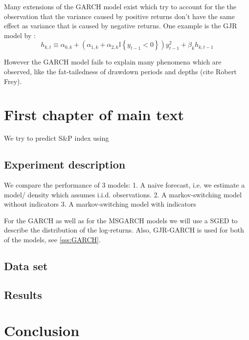 \documentclass[11pt,a4paper]{article}
\begin{document}
Many extensions of the GARCH model exist which try to account for the the observation that the variance caused by positive returns don't have the same effect as variance that is caused by negative returns. One example is the GJR model by \cite{}: $$ h_{k, t} \equiv \alpha_{0, k}+\left(\alpha_{1, k}+\alpha_{2, k} \mathbb{I}\left\{y_{t-1}<0\right\}\right) y_{t-1}^2+\beta_k h_{k, t-1}$$

However the GARCH model fails to explain many phenomena which are observed, like the fat-tailedness of drawdown periods and depths (cite Robert Frey).

\section{First chapter of main text}
We try to predict S\&P index using 

\subsection{Experiment description}
We compare the performance of 3 models: 
1. A naive forecast, i.e. we estimate a model/ density which assumes i.i.d. observations. 
2. A markov-switching model without indicators
3. A markov-switching model with indicators

For the GARCH as well as for the MSGARCH models we will use a \ac{SGED} to describe the distribution of the log-returns.
Also, GJR-GARCH is used for both of the models, see \cref{sss:GARCH}.



\subsection{Data set}

\subsection{Results}

\section{Conclusion}


\newpage


\pagestyle{fancy}						
\fancyhf{}								
\fancyhead[R]{}							 
\renewcommand{\headrulewidth}{0pt}	 
\fancyfoot[R]{\thepage}				 
\renewcommand{\footrulewidth}{0pt}	 
\setcounter{page}{5}
\newpage\clearpage
\end{document}
